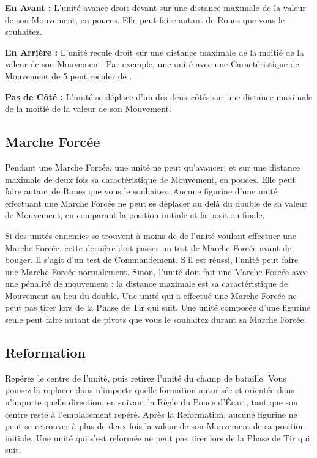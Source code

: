 \noindent\textbf{En Avant :} L'unité avance droit devant sur une distance maximale de la valeur de son Mouvement, en pouces. Elle peut faire autant de Roues que vous le souhaitez.

\noindent\textbf{En Arrière :} L'unité recule droit sur une distance maximale de la moitié de la valeur de son Mouvement. Par exemple, une unité avec une Caractéristique de Mouvement de 5 peut reculer de .

\noindent\textbf{Pas de Côté :} L'unité se déplace d'un des deux côtés sur une distance maximale de la moitié de la valeur de son Mouvement.

\hypertarget{marchmove}{\subsection{Marche Forcée}}
\label{march_move}

Pendant une Marche Forcée, une unité ne peut qu'avancer, et sur une distance maximale de deux fois sa caractéristique de Mouvement, en pouces. Elle peut faire autant de Roues que vous le souhaitez. Aucune figurine d'une unité effectuant une Marche Forcée ne peut se déplacer au delà du double de sa valeur de Mouvement, en comparant la position initiale et la position finale.

Si des unités ennemies se trouvent à moins de  de l'unité voulant effectuer une Marche Forcée, cette dernière doit passer un test de Marche Forcée avant de bouger. Il s'agit d'un test de Commandement. S'il est réussi, l'unité peut faire une Marche Forcée normalement. Sinon, l'unité doit fait une Marche Forcée avec une pénalité de mouvement : la distance maximale est sa caractéristique de Mouvement au lieu du double. Une unité qui a effectué une Marche Forcée ne peut pas tirer lors de la Phase de Tir qui suit. Une unité composée d'une figurine seule peut faire autant de pivots que vous le souhaitez durant sa Marche Forcée.

\hypertarget{reform}{\subsection{Reformation}}

Repérez le centre de l'unité, puis retirez l'unité du champ de bataille. Vous pouvez la replacer dans n'importe quelle formation autorisée et orientée dans n'importe quelle direction, en suivant la Règle du Pouce d'Écart, tant que son centre reste à l'emplacement repéré. Après la Reformation, aucune figurine ne peut se retrouver à plus de deux fois la valeur de son Mouvement de sa position initiale. Une unité qui s'est reformée ne peut pas tirer lors de la Phase de Tir qui suit.

